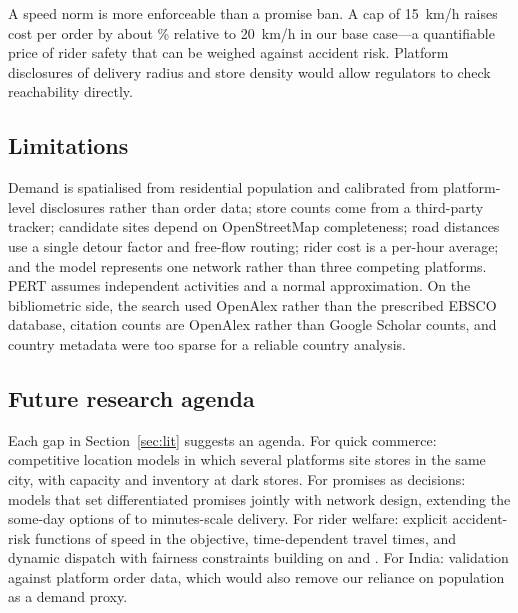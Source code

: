 A speed norm is more enforceable than a promise ban. A cap of 15~km/h raises cost per order by about \SpeedCapPremiumPct\% relative to 20~km/h in our base case---a quantifiable price of rider safety that can be weighed against accident risk. Platform disclosures of delivery radius and store density would allow regulators to check reachability directly.

\subsection{Limitations}

Demand is spatialised from residential population and calibrated from platform-level disclosures rather than order data; store counts come from a third-party tracker; candidate sites depend on OpenStreetMap completeness; road distances use a single detour factor and free-flow routing; rider cost is a per-hour average; and the model represents one network rather than three competing platforms. PERT assumes independent activities and a normal approximation. On the bibliometric side, the search used OpenAlex rather than the prescribed EBSCO database, citation counts are OpenAlex rather than Google Scholar counts, and country metadata were too sparse for a reliable country analysis.

\subsection{Future research agenda}

Each gap in Section~\ref{sec:lit} suggests an agenda. For quick commerce: competitive location models in which several platforms site stores in the same city, with capacity and inventory at dark stores. For promises as decisions: models that set differentiated promises jointly with network design, extending the some-day options of \citet{voigt2025} to minutes-scale delivery. For rider welfare: explicit accident-risk functions of speed in the objective, time-dependent travel times, and dynamic dispatch with fairness constraints building on \citet{bhattacharya2026} and \citet{carlsson2026}. For India: validation against platform order data, which would also remove our reliance on population as a demand proxy.
